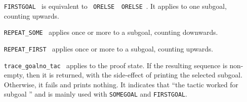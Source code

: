 \begin{isabellebody}
\begin{isamarkuptext}
\begin{description}
  \item \verb|FIRSTGOAL|~ is equivalent to ~\verb|ORELSE|~~\verb|ORELSE|~.  It
  applies  to one subgoal, counting upwards.

  \item \verb|REPEAT_SOME|~ applies  once or
  more to a subgoal, counting downwards.

  \item \verb|REPEAT_FIRST|~ applies  once or
  more to a subgoal, counting upwards.

  \item \verb|trace_goalno_tac|~ applies 
  to the proof state.  If the resulting sequence is non-empty, then it
  is returned, with the side-effect of printing the selected subgoal.
  Otherwise, it fails and prints nothing.  It indicates that ``the
  tactic worked for subgoal '' and is mainly used with \verb|SOMEGOAL| and \verb|FIRSTGOAL|.

  \end{description}%
\end{isamarkuptext}%
\isamarkuptrue%
%
\endisatagmlref
{\isafoldmlref}%
%
\isadelimmlref
%
\endisadelimmlref
%
\isadelimtheory
%
\endisadelimtheory
%
\isatagtheory
{}\isamarkupfalse%
%
\endisatagtheory
{\isafoldtheory}%
%
\isadelimtheory
%
\endisadelimtheory
\isanewline
\end{isabellebody}%
